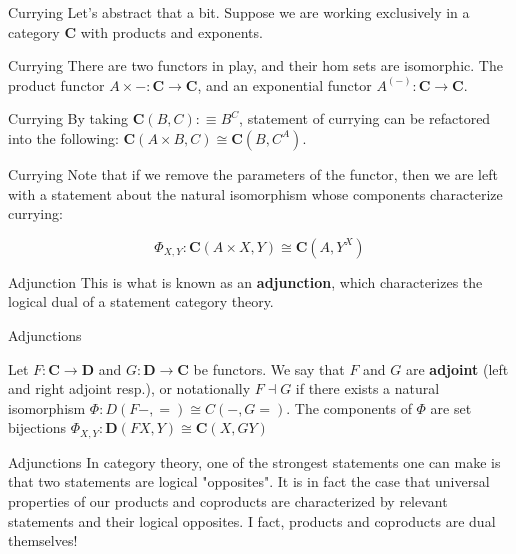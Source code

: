 \documentclass[tikz]{beamer}
\theoremstyle{definition}
\newcommand{\cat}[1]{\mathbf{#1}}
\begin{document}
\begin{frame}{Currying}
    Let's abstract that a bit. Suppose we are working exclusively in a category $\cat{C}$ with products and exponents.
\end{frame}

\begin{frame}{Currying}
   There are two functors in play, and their hom sets are isomorphic. The product functor $A \times - : \cat{C} \to \cat{C}$, and an exponential functor $A^{(-)}: \cat{C} \to \cat{C}$. 
\end{frame}

\begin{frame}{Currying}
   By taking $\cat{C}(B, C) :\equiv B^C$, statement of currying can  be refactored into the following: $\cat{C}(A \times B, C) \cong \cat{C}(B, C^A)$.
\end{frame}

\begin{frame}{Currying}
   Note that if we remove the parameters of the functor, then we are left with a statement about the natural isomorphism whose components characterize currying: 
   
   \begin{center}
   	\begin{equation*}
		\Phi_{X,Y} : \cat{C}(A \times X, Y) \cong \cat{C}(A, Y^X)
	\end{equation*}
   \end{center}
\end{frame}

\begin{frame}{Adjunction}
   This is what is known as an \textbf{adjunction}, which characterizes the logical dual of a statement category theory. 
\end{frame}

\begin{frame}{Adjunctions}
   \begin{definition}[Adjunction]
   	Let $F: \cat{C} \to \cat{D}$ and $G: \cat{D} \to \cat{C}$ be functors. We say that $F$ and $G$ are \textbf{adjoint} (left and right adjoint resp.), or notationally $F \dashv G$ if there exists a natural isomorphism $\Phi : D(F-,=) \cong C(-, G=)$. The components of $\Phi$ are set bijections $\Phi_{X,Y} : \cat{D}(FX, Y) \cong \cat{C}(X, GY)$
   \end{definition}
\end{frame}

\begin{frame}{Adjunctions}
   In category theory, one of the strongest statements one can make is that two statements are logical "opposites". It is in fact the case that universal properties of our products and coproducts are characterized by relevant statements and their logical opposites. I fact, products and coproducts are dual themselves!
\end{frame}
\end{document}
